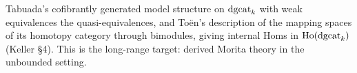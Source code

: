 \begin{theorem}
\label{thm:dgcat-model}
\notready
{}
Tabuada's cofibrantly generated model structure on $\mathrm{dgcat}_k$ with weak equivalences the
quasi-equivalences, and Toën's description of the mapping spaces of its homotopy category
through bimodules, giving internal Homs in $\mathrm{Ho}(\mathrm{dgcat}_k)$ (Keller \S 4). This is the
long-range target: derived Morita theory in the unbounded setting.
\end{theorem}
